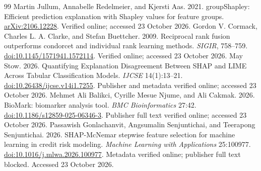 \begin{thebibliography}{99}
 Martin Jullum, Annabelle Redelmeier, and Kjersti Aas. 2021. groupShapley: Efficient prediction explanation with Shapley values for feature groups. \href{https://arxiv.org/abs/2106.12228}{arXiv:2106.12228}. Verified online; accessed 23 October 2026.
 Gordon V. Cormack, Charles L. A. Clarke, and Stefan Buettcher. 2009. Reciprocal rank fusion outperforms condorcet and individual rank learning methods. \emph{SIGIR}, 758--759. \href{https://doi.org/10.1145/1571941.1572114}{doi:10.1145/1571941.1572114}. Verified online; accessed 23 October 2026.
 May Stow. 2026. Quantifying Explanation Disagreement Between SHAP and LIME Across Tabular Classification Models. \emph{IJCSE} 14(1):13--21. \href{https://doi.org/10.26438/ijcse.v14i1.7255}{doi:10.26438/ijcse.v14i1.7255}. Publisher and metadata verified online; accessed 23 October 2026.
 Mehmet Ali Balikci, Cyrille Mesue Njume, and Ali Cakmak. 2026. BioMark: biomarker analysis tool. \emph{BMC Bioinformatics} 27:42. \href{https://doi.org/10.1186/s12859-025-06346-3}{doi:10.1186/s12859-025-06346-3}. Publisher full text verified online; accessed 23 October 2026.
 Passawish Gonlachanvit, Angsumalin Senjuntichai, and Teerapong Senjuntichai. 2026. SHAP-McNemar stepwise feature selection for machine learning in credit risk modeling. \emph{Machine Learning with Applications} 25:100977. \href{https://doi.org/10.1016/j.mlwa.2026.100977}{doi:10.1016/j.mlwa.2026.100977}. Metadata verified online; publisher full text blocked. Accessed 23 October 2026.


\end{thebibliography}

